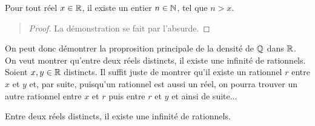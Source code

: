 \begin{prop}[Archimède]
    Pour tout réel $x \in \mathbb{R}$, il existe un entier $n \in \mathbb{N}$, tel que $n > x$. 
\end{prop}

\begin{quote}
    \begin{footnotesize}
        \begin{proof}
            La démonstration se fait par l'absurde. 
        \end{proof}
    \end{footnotesize}
\end{quote}

On peut donc démontrer la proprosition principale de la densité de $\mathbb{Q}$ dans $\mathbb{R}$. 
On veut montrer qu'entre deux réels distincts, il existe une infinité de rationnels. 
Soient $x, y \in \mathbb{R}$ distincts. Il suffit juste de montrer qu'il existe un rationnel $r$ entre $x$ et $y$ et, par suite, 
puisqu'un rationnel est aussi un réel, on pourra trouver un autre rationnel entre $x$ et $r$ puis entre $r$ et $y$ et 
ainsi de suite... 

\begin{proposition}[Densité]
    Entre deux réels distincts, il existe une infinité de rationnels. 
\end{proposition}






